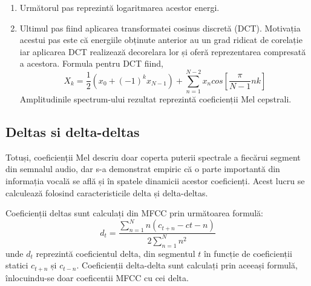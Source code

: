 \documentclass[a4paper,12pt]{book}
\begin{document}
\begin{enumerate}
\begin{equation*}
\begin{cases}
							\frac{k-f(m-1)}{f(m) - f(m-1)}&\quad f(m-1)\leq k\leq f(m) \\[5pt]
							\frac{f(m+1)-k}{f(m+1) - f(m)}&\quad f(m)\leq k\leq f(m+1) \\[3pt]
							\quad \quad 0&\quad k>f(m+1)
							\end{cases}
						\end{equation*}
						unde $m$ este numărul frecvenței scalate, iar $k$ este frecvența curentă din spectrum. \newline
						Filtrele triunghiulare sunt înmulțite apoi cu "power spectrum"-ul obținut la pasul anterior și se obțin astfel energiile din fiecare filtru Mel.
						\item Următorul pas reprezintă logaritmarea acestor energi.
						\item Ultimul pas fiind aplicarea transformatei cosinus discretă (DCT). Motivația acestui pas este că energiile obținute anterior au un grad ridicat de corelație iar aplicarea DCT realizează decorelara lor și oferă reprezentarea compresată a acestora.
						Formula pentru DCT fiind,
						\begin{equation*}
							X_k = \frac{1}{2}(x_0 + (-1)^k x_{N-1}) + \sum_{n=1}^{N-2} x_n cos[\frac{\pi}{N-1}nk]
						\end{equation*}
						Amplitudinile spectrum-ului rezultat reprezintă coeficienții Mel cepstrali.
				\end{enumerate} \par
				\subsection{Deltas si delta-deltas}
					Totuși, coeficienții Mel descriu doar coperta puterii spectrale a fiecărui segment din semnalul audio, dar s-a demonstrat empiric că o parte importantă din informația vocală se află și în spatele dinamicii acestor coeficienți. Acest lucru se calculează folosind caracteristicile delta și delta-deltas. \par Coeficienții deltas sunt calculați din MFCC prin următoarea formulă:
					\begin{equation*}
						d_t = \frac{\sum_{n=1}^{N} n(c_{t+n}-c{t-n})}{2\sum_{n=1}^{N}n^2}
					\end{equation*}
					unde $d_t$ reprezintă coeficientul delta, din segmentul $t$  în funcție de coeficienții statici $c_{t+n}$ și $c_{t-n}$. 
					Coeficienții delta-delta sunt calculați prin aceeași formulă, înlocuindu-se doar coeficentii MFCC cu cei delta. \par
				
\end{document}
